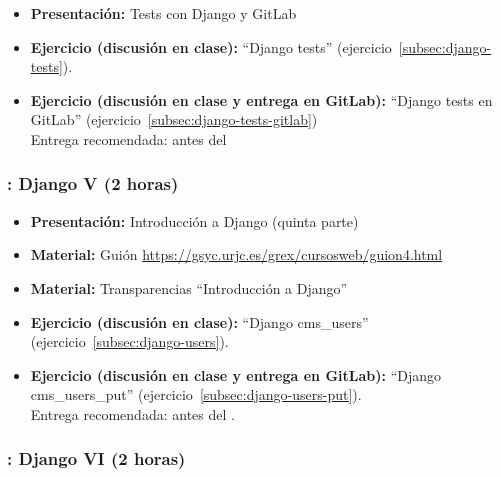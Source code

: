 \documentclass[a4paper,12pt]{article}
\begin{document}
\begin{itemize}
\item \textbf{Presentación:} Tests con Django y GitLab
\item \textbf{Ejercicio (discusión en clase):} ``Django tests'' (ejercicio~\ref{subsec:django-tests}).
\item \textbf{Ejercicio (discusión en clase y entrega en GitLab):} ``Django tests en GitLab'' (ejercicio~\ref{subsec:django-tests-gitlab}) \\
  Entrega recomendada: antes del \martesK
\end{itemize}


\subsubsection{\martesK: Django V (2 horas)}
\label{cal:martesK}

\begin{itemize}
 \item \textbf{Presentación:} Introducción a Django (quinta parte)
 \item \textbf{Material:} Guión \url{https://gsyc.urjc.es/grex/cursosweb/guion4.html}
 \item \textbf{Material:} Transparencias ``Introducción a Django''
 \item \textbf{Ejercicio (discusión en clase):} ``Django cms\_users'' (ejercicio~\ref{subsec:django-users}).
 \item \textbf{Ejercicio (discusión en clase y entrega en GitLab):} ``Django cms\_users\_put'' (ejercicio~\ref{subsec:django-users-put}). \\
  Entrega recomendada: antes del \martesL.
\end{itemize}

\subsubsection{\martesL: Django VI (2 horas)}
\label{cal:martesL}
\end{document}
